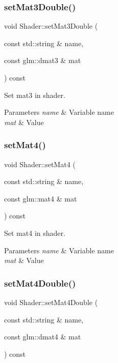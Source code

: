\subsubsection{\texorpdfstring{set\+Mat3\+Double()}{setMat3Double()}}
{\footnotesize\ttfamily void Shader\+::set\+Mat3\+Double (\begin{DoxyParamCaption}\item[{const std\+::string \&}]{name,  }\item[{const glm\+::dmat3 \&}]{mat }\end{DoxyParamCaption}) const}



Set mat3 in shader. 


\begin{DoxyParams}{Parameters}
{\em name} & Variable name \\
\hline
{\em mat} & Value \\
\hline
\end{DoxyParams}
\mbox{\label{class_shader_a8e711c96f3e1722cbfb88fde9478977c}} 
\subsubsection{\texorpdfstring{set\+Mat4()}{setMat4()}}
{\footnotesize\ttfamily void Shader\+::set\+Mat4 (\begin{DoxyParamCaption}\item[{const std\+::string \&}]{name,  }\item[{const glm\+::mat4 \&}]{mat }\end{DoxyParamCaption}) const}



Set mat4 in shader. 


\begin{DoxyParams}{Parameters}
{\em name} & Variable name \\
\hline
{\em mat} & Value \\
\hline
\end{DoxyParams}
\mbox{\label{class_shader_a68b9ec9f32795c0f4d8e4b5a71bfb11f}} 
\subsubsection{\texorpdfstring{set\+Mat4\+Double()}{setMat4Double()}}
{\footnotesize\ttfamily void Shader\+::set\+Mat4\+Double (\begin{DoxyParamCaption}\item[{const std\+::string \&}]{name,  }\item[{const glm\+::dmat4 \&}]{mat }\end{DoxyParamCaption}) const}



